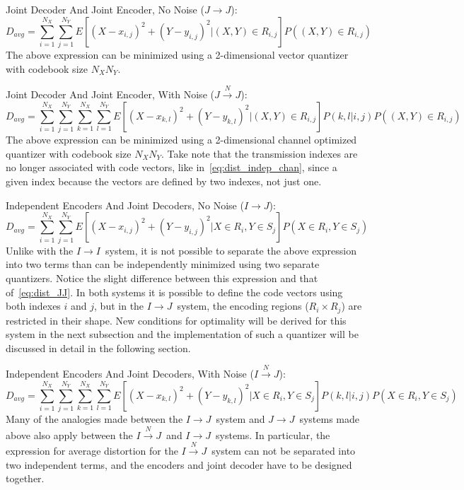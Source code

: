 \documentclass[10pt]{article}
\newcommand{\sysII}{\mbox{$I \rightarrow I$}}
\newcommand{\sysIJN}{\mbox{$I \overset{N}{\rightarrow} J$}}
\newcommand{\sysIJ}{\mbox{$I \rightarrow J$}}
\newcommand{\sysJJN}{\mbox{$J \overset{N}{\rightarrow} J$}}
\newcommand{\sysJJ}{\mbox{$J \rightarrow J$}}
\begin{document}
{\sc \noindent Joint Decoder And Joint Encoder, No Noise (\sysJJ):}
\begin{equation}
  \label{eq:dist_JJ}
    D_{avg} = \sum_{i=1}^{N_X}\sum_{j=1}^{N_Y} E[{(X-x_{i,j})}^2 + {(Y-y_{i,j})}^2 | (X,Y) \in R_{i,j}]P((X,Y) \in R_{i,j})
\end{equation}
The above expression can be minimized using a 2-dimensional vector quantizer with codebook size $N_XN_Y$.

{\sc \noindent Joint Decoder And Joint Encoder, With Noise (\sysJJN):}
\begin{equation}
    D_{avg} = \sum_{i=1}^{N_X}\sum_{j=1}^{N_Y}\sum_{k=1}^{N_X}\sum_{l=1}^{N_Y} E[{(X-x_{k,l})}^2 +
    {(Y-y_{k,l})}^2 | (X,Y) \in R_{i,j}]P(k,l|i,j)P((X,Y) \in R_{i,j})
\end{equation}
The above expression can be minimized using a 2-dimensional channel optimized quantizer with codebook size $N_XN_Y$. Take note that the transmission indexes are no longer associated with code vectors, like in~\ref{eq:dist_indep_chan}, since a given index because the vectors are defined by two indexes, not just one.


{\sc \noindent Independent Encoders And Joint Decoders, No Noise (\sysIJ):}
\begin{equation}
    \label{eq:dist_IJ}
    D_{avg} = \sum_{i=1}^{N_X}\sum_{j=1}^{N_Y} E[{(X-x_{i,j})}^2 + {(Y-y_{i,j})}^2 | X \in R_i, Y \in S_j]P(X \in R_i, Y \in S_j)
\end{equation}
Unlike with the \sysII\ system, it is not possible to separate the above expression into two terms than can be independently minimized using two separate quantizers. Notice the slight difference between this expression and that of~\ref{eq:dist_JJ}. In both systems it is possible to define the code vectors using both indexes $i$ and $j$, but in the \sysIJ\ system, the encoding regions ($R_i \times R_j$) are restricted in their shape. New conditions for optimality will be derived for this system in the next subsection and the implementation of such a quantizer will be discussed in detail in the following section. 

{\sc \noindent Independent Encoders And Joint Decoders, With Noise (\sysIJN):}
\begin{equation}
    \label{eq:dist_IJN}
    D_{avg} = \sum_{i=1}^{N_X}\sum_{j=1}^{N_Y}\sum_{k=1}^{N_X}\sum_{l=1}^{N_Y} E[{(X-x_{k,l})}^2 +
    {(Y-y_{k,l})}^2 | X \in R_i, Y \in S_j]P(k,l|i,j)P(X \in R_i, Y \in S_j)
\end{equation}
Many of the analogies made between the \sysIJ\ system and \sysJJ\ systems made above also apply between the \sysIJN\ and \sysIJ\ systems. In particular, the expression for average distortion for the \sysIJN\ system can not be separated into two independent terms, and the encoders and joint decoder have to be designed together.
\end{document}
